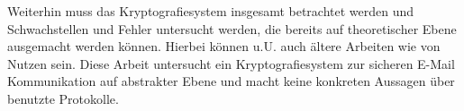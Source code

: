 Weiterhin muss das Kryptografiesystem insgesamt betrachtet werden und Schwachstellen und Fehler untersucht werden, die bereits auf theoretischer Ebene ausgemacht werden können. Hierbei können u.U. auch ältere Arbeiten wie   von Nutzen sein. Diese Arbeit untersucht ein Kryptografiesystem zur sicheren E-Mail Kommunikation auf abstrakter Ebene und macht keine konkreten Aussagen über benutzte Protokolle.
